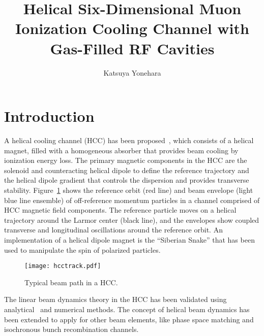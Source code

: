 \documentclass[11pt]{article}
\title{Helical Six-Dimensional Muon Ionization Cooling Channel with Gas-Filled RF Cavities}
\author{Katsuya Yonehara}
\affiliation{Fermi National Accelerator Laboratory,\\Batavia, IL 60510, USA}
\begin{document}
\maketitle
\flushbottom

\section{Introduction}
\label{sec:intro}

A helical cooling channel (HCC) has been proposed~\cite{Slava05}, which consists of a helical magnet, filled with a homogeneous absorber that provides beam cooling by ionization energy loss.
The primary magnetic components in the HCC are the solenoid and counteracting helical dipole to define the reference trajectory and the helical dipole gradient that controls the dispersion and provides transverse stability. Figure~\ref{fig:orbit} shows the reference orbit (red line) and beam envelope (light blue line ensemble) of off-reference momentum particles in a channel comprised of HCC magnetic field components.
The reference particle moves on a helical trajectory around the Larmor center (black line), and 
the envelopes show coupled transverse and longitudinal oscillations around the reference orbit. 
An implementation of a helical dipole magnet is the ``Siberian Snake'' that has been used to 
manipulate the spin of polarized particles. 
\begin{figure}[h]
\centering
 \texttt{[image: hcctrack.pdf]}
 \caption{Typical beam path in a HCC.}
 \label{fig:orbit}
\end{figure}
The linear beam dynamics theory in the HCC has been validated using analytical~\cite{Slava05} and numerical methods. %
The concept of helical beam dynamics has been extended to apply for other beam elements, like phase space matching and isochronous bunch recombination channels. 
\end{document}
